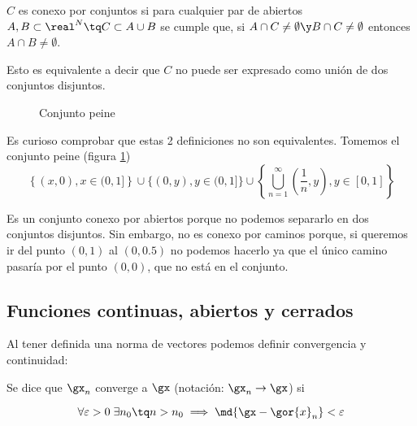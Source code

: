 \documentclass{apuntes}
\begin{document}
\begin{defn}
$C$ es conexo por conjuntos si para cualquier par de abiertos $A,B \subset \real^N \tq C\subset A\cup B$ se cumple que, si $A\cap C\neq \emptyset \y B\cap C \neq \emptyset $ entonces $ A\cap B \neq \emptyset$.

Esto es equivalente a decir que $C$ no puede ser expresado como unión de dos conjuntos disjuntos.
\end{defn}


\begin{remark}

\begin{figure}[hbtp]
\label{imgPeine}
\begin{center}
\caption{Conjunto peine}
\end{center}
\end{figure}

Es curioso comprobar que estas 2 definiciones no son equivalentes. Tomemos el conjunto peine (figura \ref{imgPeine})
\[ \left\{(x,0), x\in (0,1]\right\} \cup \{(0,y), y \in (0,1]\} \cup \left\{\bigcup_{n=1}^{\infty}{\left(\frac{1}{n},y\right), y \in [0,1]}\right\} \]

Es un conjunto conexo por abiertos porque no podemos separarlo en dos conjuntos disjuntos. Sin embargo, no es conexo por caminos porque, si queremos ir del punto $(0,1)$ al $(0,0.5)$ no podemos hacerlo ya que el único camino pasaría por el punto $(0,0)$, que no está en el conjunto.
\end{remark}

\subsection{Funciones continuas, abiertos y cerrados}
 
 Al tener definida una norma de vectores podemos definir convergencia y continuidad:

\begin{defn}[Convergencia] Se dice que $\gx_n$ converge a $\gx$ (notación: $\gx_n \to \gx$) si

\[  \forall \varepsilon > 0\; \exists n_0 \tq n > n_0 \implies \md{\gx-\gor{x}_n}<\varepsilon \]

\end{defn}
\end{document}
